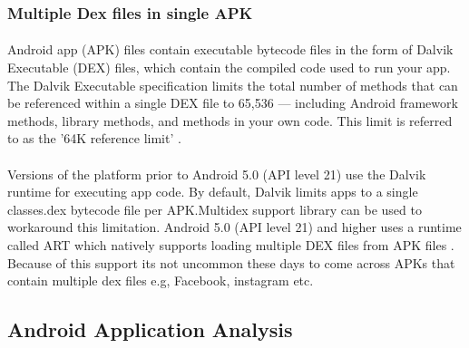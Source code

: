 \documentclass[../main.tex]{subfile}
\begin{document}
			\subsubsection{Multiple Dex files in single APK}
				\paragraph{}  Android app (APK) files contain executable bytecode files in the form of Dalvik Executable (DEX) files, which contain the compiled code used to run your app. The Dalvik Executable specification limits the total number of methods that can be referenced within a single DEX file to 65,536 — including Android framework methods, library methods, and methods in your own code. This limit is referred to as the '64K reference limit' . \cite{multidex}
				
				\paragraph{} Versions of the platform prior to Android 5.0 (API level 21) use the Dalvik runtime for executing app code. By default, Dalvik limits apps to a single classes.dex bytecode file per APK.Multidex support library can be used to workaround this limitation. Android 5.0 (API level 21) and higher uses a runtime called ART which natively supports loading multiple DEX files from APK files . Because of this support its not uncommon these days to come across APKs that contain multiple dex files e.g, Facebook, instagram etc. \cite{multidex}
		\subsection{Android Application Analysis}\label{sec:application_analysis}
		
		
\end{document}
